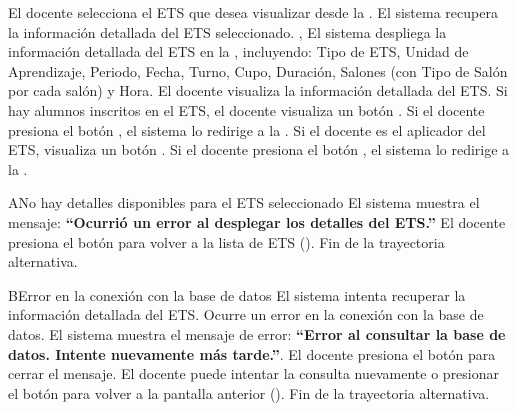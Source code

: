 \begin{UCtrayectoria}
	\UCpaso[\UCactor] El docente selecciona el ETS que desea visualizar desde la .
	\UCpaso[\UCsist] El sistema recupera la información detallada del ETS seleccionado. , 
	\UCpaso El sistema despliega la información detallada del ETS en la , incluyendo: Tipo de ETS, Unidad de Aprendizaje, Periodo, Fecha, Turno, Cupo, Duración, Salones (con Tipo de Salón por cada salón) y Hora.
	\UCpaso[\UCactor] El docente visualiza la información detallada del ETS.
	\UCpaso Si hay alumnos inscritos en el ETS, el docente visualiza un botón .
	\UCpaso[\UCactor] Si el docente presiona el botón , el sistema lo redirige a la .
	\UCpaso Si el docente es el aplicador del ETS, visualiza un botón .
	\UCpaso[\UCactor] Si el docente presiona el botón , el sistema lo redirige a la .
\end{UCtrayectoria}
\begin{UCtrayectoriaA}{A}{No hay detalles disponibles para el ETS seleccionado}
	\UCpaso El sistema muestra el mensaje: \textbf{``Ocurrió un error al desplegar los detalles del ETS.''}
	\UCpaso[\UCactor] El docente presiona el botón  para volver a la lista de ETS ().
	\UCpaso Fin de la trayectoria alternativa.
\end{UCtrayectoriaA}

\begin{UCtrayectoriaA}{B}{Error en la conexión con la base de datos}
	\UCpaso El sistema intenta recuperar la información detallada del ETS.
	\UCpaso Ocurre un error en la conexión con la base de datos.
	\UCpaso El sistema muestra el mensaje de error: \textbf{``Error al consultar la base de datos. Intente nuevamente más tarde.''}.
	\UCpaso[\UCactor] El docente presiona el botón  para cerrar el mensaje.
	\UCpaso[\UCactor] El docente puede intentar la consulta nuevamente o presionar el botón  para volver a la pantalla anterior ().
	\UCpaso Fin de la trayectoria alternativa.
\end{UCtrayectoriaA}


